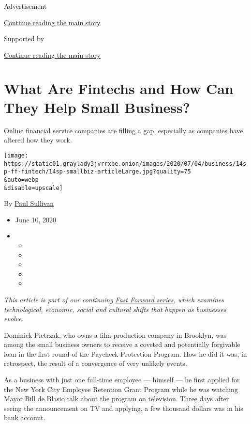 Advertisement

\protect\hyperlink{after-top}{Continue reading the main story}

Supported by

\protect\hyperlink{after-sponsor}{Continue reading the main story}

\hypertarget{what-are-fintechs-and-how-can-they-help-small-business}{%
\section{What Are Fintechs and How Can They Help Small
Business?}\label{what-are-fintechs-and-how-can-they-help-small-business}}

Online financial service companies are filling a gap, especially as
companies have altered how they work.

\texttt{[image: https://static01.graylady3jvrrxbe.onion/images/2020/07/04/business/14sp-ff-fintech/14sp-smallbiz-articleLarge.jpg?quality=75\\\&auto=webp\\\&disable=upscale]}

By \href{https://www.nytimes3xbfgragh.onion/by/paul-sullivan}{Paul
Sullivan}

\begin{itemize}
\item
  June 10, 2020
\item
  \begin{itemize}
  \item
  \item
  \item
  \item
  \item
  \end{itemize}
\end{itemize}

\emph{This article is part of our continuing}
\href{https://www.nytimes3xbfgragh.onion/spotlight/fast-forward}{\emph{Fast
Forward series}}\emph{, which examines technological, economic, social
and cultural shifts that happen as businesses evolve.}

Dominick Pietrzak, who owns a film-production company in Brooklyn, was
among the small business owners to receive a coveted and potentially
forgivable loan in the first round of the Paycheck Protection Program.
How he did it was, in retrospect, the result of a convergence of very
unlikely events.

As a business with just one full-time employee --- himself --- he first
applied for the New York City Employee Retention Grant Program while he
was watching Mayor Bill de Blasio talk about the program on television.
Three days after seeing the announcement on TV and applying, a few
thousand dollars was in his bank account.

